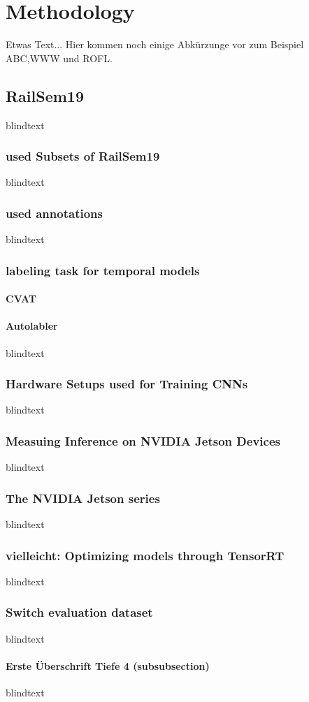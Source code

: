 \chapter{Methodology}
Etwas Text... Hier kommen noch einige Abkürzunge vor zum Beispiel \ac{ABC},\ac{WWW} und \ac{ROFL}.

\section{RailSem19}
blindtext

\subsection{used Subsets of RailSem19}
blindtext

\subsection{used annotations}
blindtext

\subsection{labeling task for temporal models}

\subsubsection{CVAT}
\subsubsection{Autolabler}
blindtext

\subsection{Hardware Setups used for Training CNNs}
blindtext

\subsection{Measuing Inference on NVIDIA Jetson Devices}
blindtext

\subsection{The NVIDIA Jetson series}
blindtext

\subsection{vielleicht: Optimizing models through TensorRT}
blindtext

\subsection{Switch evaluation dataset}
blindtext

\subsubsection{Erste Überschrift Tiefe 4 (subsubsection)}
blindtext
